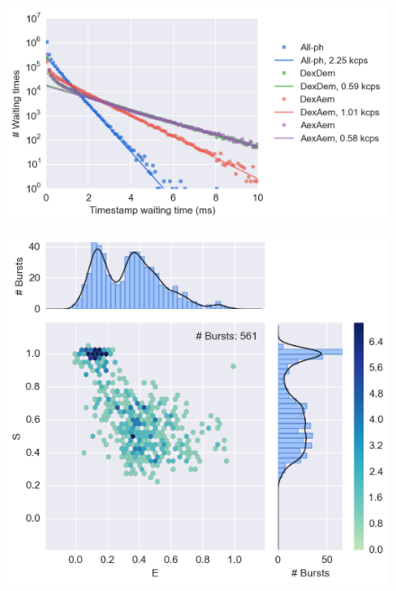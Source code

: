 \begin{figure}
\begin{center}
\includegraphics[width=0.75\columnwidth]{"figures/ph_delays_distrib_all/ph_delays_distrib_all"}
\caption[]{}
\end{center}
\end{figure}




\begin{figure}
\begin{center}
\includegraphics[width=0.65\columnwidth]{"figures/alex_jointplot/alex_jointplot"}
\caption[]{}
\end{center}
\end{figure}









